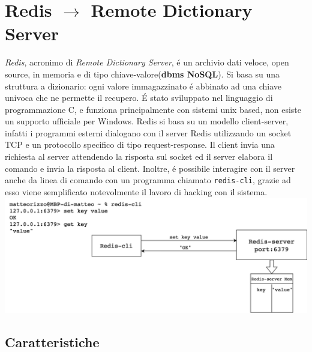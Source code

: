 \chapter{Redis $\to$ Remote Dictionary Server}

\emph{Redis}, acronimo di \emph{Remote Dictionary Server}, é un archivio dati veloce, open source, in memoria e di tipo chiave-valore(\textbf{dbms NoSQL}).
Si basa su una struttura a dizionario: ogni valore immagazzinato é abbinato ad una chiave univoca che ne permette il recupero.
É stato sviluppato nel linguaggio di programmazione C, e funziona principalmente con sistemi unix based, non esiste un supporto ufficiale
per Windows.
Redis si basa su un modello client-server, infatti i programmi esterni dialogano con il server Redis utilizzando un socket TCP e un protocollo specifico
di tipo request-response.
Il client invia una richiesta al server attendendo la risposta sul socket ed il server elabora il comando e
invia la risposta al client.
Inoltre, é possibile interagire con il server anche da linea di comando con un programma chiamato \texttt{redis-cli}, grazie ad esso viene
semplificato notevolmente il lavoro di hacking con il sistema.\\

\includegraphics[width=1\textwidth]{img/redisClientServer}

\section{Caratteristiche}
